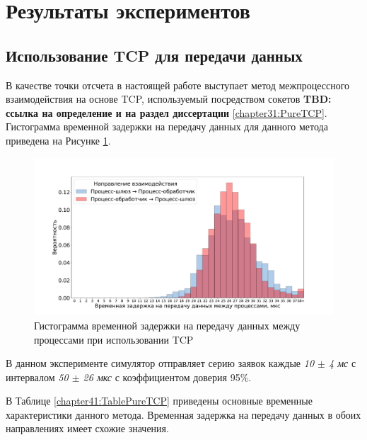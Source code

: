 \section{Результаты экспериментов}

\subsection{Использование TCP для передачи данных}

В качестве точки отсчета в настоящей работе выступает метод межпроцессного взаимодействия на основе TCP, используемый посредством сокетов \textbf{TBD: ссылка на определение и на раздел диссертации} \ref{chapter31:PureTCP}. Гистограмма временной задержки на передачу данных для данного метода приведена на Рисунке \ref{chapter41:FigPureTCP}.

\begin{figure}[!h]
\caption{Гистограмма временной задержки на передачу данных между процессами при использовании TCP}
\label{chapter41:FigPureTCP}
\includegraphics[width=\textwidth]{../../graphics/hist/PureTCP}
\end{figure}

В данном эксперименте симулятор отправляет серию заявок каждые \textit{10 $\pm$ 4 мс} с интервалом \textit{50 $\pm$ 26 мкс}  с коэффициентом доверия 95\%.

В Таблице \ref{chapter41:TablePureTCP} приведены основные временные характеристики данного метода. Временная задержка на передачу данных в обоих направлениях имеет схожие значения.

